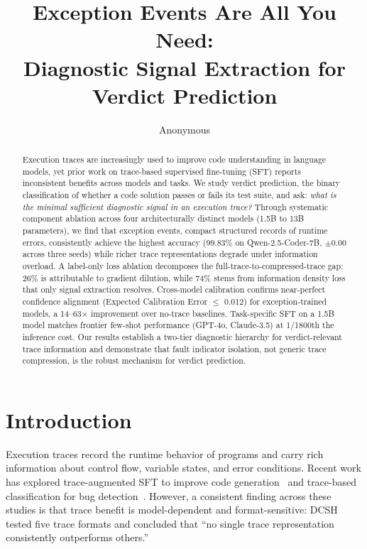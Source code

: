 \documentclass[11pt,a4paper]{article}
\title{Exception Events Are All You Need:\\Diagnostic Signal Extraction for Verdict Prediction}
\author{Anonymous}
\date{}
\begin{document}
\maketitle

\begin{abstract}
Execution traces are increasingly used to improve code understanding in language models, yet prior work on trace-based supervised fine-tuning (SFT) reports inconsistent benefits across models and tasks. We study verdict prediction, the binary classification of whether a code solution passes or fails its test suite, and ask: \emph{what is the minimal sufficient diagnostic signal in an execution trace?} Through systematic component ablation across four architecturally distinct models (1.5B to 13B parameters), we find that exception events, compact structured records of runtime errors, consistently achieve the highest accuracy (99.83\% on Qwen-2.5-Coder-7B, $\pm$0.00 across three seeds) while richer trace representations degrade under information overload. A label-only loss ablation decomposes the full-trace-to-compressed-trace gap: 26\% is attributable to gradient dilution, while 74\% stems from information density loss that only signal extraction resolves. Cross-model calibration confirms near-perfect confidence alignment (Expected Calibration Error $\leq$ 0.012) for exception-trained models, a 14--63$\times$ improvement over no-trace baselines. Task-specific SFT on a 1.5B model matches frontier few-shot performance (GPT-4o, Claude-3.5) at 1/1800th the inference cost. Our results establish a two-tier diagnostic hierarchy for verdict-relevant trace information and demonstrate that fault indicator isolation, not generic trace compression, is the robust mechanism for verdict prediction.
\end{abstract}

\section{Introduction}
\label{sec:intro}

Execution traces record the runtime behavior of programs and carry rich information about control flow, variable states, and error conditions. Recent work has explored trace-augmented SFT to improve code generation~\cite{dcsh2025,tracepile2025} and trace-based classification for bug detection~\cite{traced2024}. However, a consistent finding across these studies is that trace benefit is model-dependent and format-sensitive: DCSH~\cite{dcsh2025} tested five trace formats and concluded that ``no single trace representation consistently outperforms others.''
\end{document}

